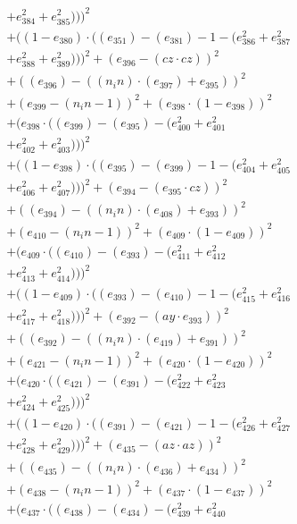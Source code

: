 \documentclass[10pt, a4paper]{article}
\begin{document}
\begin{small}
\begin{align*}
& + e_{384}^{2} + e_{385}^{2})))^{2} \\
& + ((1 - e_{380})  \cdot  ((e_{351}) - (e_{381}) - 1 - (e_{386}^{2} + e_{387}^{2} \\
& + e_{388}^{2} + e_{389}^{2})))^{2} + (e_{396} - (cz  \cdot  cz))^{2} \\
& + ((e_{396}) - ((n_in)  \cdot  (e_{397}) + e_{395}))^{2} \\
& + (e_{399} - (n_in - 1))^{2} + (e_{398}  \cdot  (1 - e_{398}))^{2} \\
& + (e_{398}  \cdot  ((e_{399}) - (e_{395}) - (e_{400}^{2} + e_{401}^{2} \\
& + e_{402}^{2} + e_{403}^{2})))^{2} \\
& + ((1 - e_{398})  \cdot  ((e_{395}) - (e_{399}) - 1 - (e_{404}^{2} + e_{405}^{2} \\
& + e_{406}^{2} + e_{407}^{2})))^{2} + (e_{394} - (e_{395}  \cdot  cz))^{2} \\
& + ((e_{394}) - ((n_in)  \cdot  (e_{408}) + e_{393}))^{2} \\
& + (e_{410} - (n_in - 1))^{2} + (e_{409}  \cdot  (1 - e_{409}))^{2} \\
& + (e_{409}  \cdot  ((e_{410}) - (e_{393}) - (e_{411}^{2} + e_{412}^{2} \\
& + e_{413}^{2} + e_{414}^{2})))^{2} \\
& + ((1 - e_{409})  \cdot  ((e_{393}) - (e_{410}) - 1 - (e_{415}^{2} + e_{416}^{2} \\
& + e_{417}^{2} + e_{418}^{2})))^{2} + (e_{392} - (ay  \cdot  e_{393}))^{2} \\
& + ((e_{392}) - ((n_in)  \cdot  (e_{419}) + e_{391}))^{2} \\
& + (e_{421} - (n_in - 1))^{2} + (e_{420}  \cdot  (1 - e_{420}))^{2} \\
& + (e_{420}  \cdot  ((e_{421}) - (e_{391}) - (e_{422}^{2} + e_{423}^{2} \\
& + e_{424}^{2} + e_{425}^{2})))^{2} \\
& + ((1 - e_{420})  \cdot  ((e_{391}) - (e_{421}) - 1 - (e_{426}^{2} + e_{427}^{2} \\
& + e_{428}^{2} + e_{429}^{2})))^{2} + (e_{435} - (az  \cdot  az))^{2} \\
& + ((e_{435}) - ((n_in)  \cdot  (e_{436}) + e_{434}))^{2} \\
& + (e_{438} - (n_in - 1))^{2} + (e_{437}  \cdot  (1 - e_{437}))^{2} \\
& + (e_{437}  \cdot  ((e_{438}) - (e_{434}) - (e_{439}^{2} + e_{440}^{2} \\

\end{align*}
\end{small}
\end{document}
